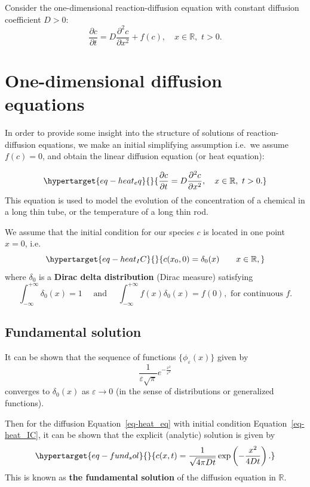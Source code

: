 \documentclass[
  letterpaper,
  DIV=11,
  numbers=noendperiod]{scrreprt}
\theoremstyle{plain}
\theoremstyle{definition}
\theoremstyle{plain}
\theoremstyle{remark}
\begin{document}
Consider the one-dimensional reaction-diffusion equation with constant
diffusion coefficient \(D > 0\): \[
\frac{\partial c}{\partial t} = D \frac{\partial^2 c}{\partial x^2}  + f(c), \quad x\in \mathbb R, \, \, t >0.
\]

\hypertarget{one-dimensional-diffusion-equations}{%
\section{One-dimensional diffusion
equations}\label{one-dimensional-diffusion-equations}}

In order to provide some insight into the structure of solutions of
reaction-diffusion equations, we make an initial simplifying assumption
i.e.~we assume \(f(c)=0\), and obtain the linear diffusion equation (or
heat equation):

\begin{equation}\protect\hypertarget{eq-heat_eq}{}{
\frac{\partial c}{\partial t} = D \frac{\partial^2 c}{\partial x^2},   \quad x\in \mathbb R, \, \, t >0.
}\label{eq-heat_eq}\end{equation} This equation is used to model the
evolution of the concentration of a chemical in a long thin tube, or the
temperature of a long thin rod.

We assume that the initial condition for our species \(c\) is located in
one point \(x=0\), i.e.~
\begin{equation}\protect\hypertarget{eq-heat_IC}{}{
c(x_0 , 0) = \delta_0(x)\qquad x \in \mathbb R, 
}\label{eq-heat_IC}\end{equation} where \(\delta_0\) is a \textbf{Dirac
delta distribution} (Dirac measure) satisfying \[
\int_{-\infty}^{+\infty} \delta_0(x) = 1 \quad \text{ and } \quad \int_{-\infty}^{+\infty} f(x) \delta_0(x) = f(0) , \text{ for continuous } f. 
\]

\hypertarget{fundamental-solution}{%
\subsection{Fundamental solution}\label{fundamental-solution}}

It can be shown that the sequence of functions
\(\{ \phi_\varepsilon(x) \}\) given by \[
\frac 1{\varepsilon \sqrt{\pi} } e^{ - \frac{x^2}{ \varepsilon^2}}
\] converges to \(\delta_0(x)\) as \(\varepsilon \to 0\) (in the sense
of distributions or generalized functions).

Then for the diffusion Equation~\ref{eq-heat_eq} with initial condition
Equation~\ref{eq-heat_IC}, it can be shown that the explicit (analytic)
solution is given by
\begin{equation}\protect\hypertarget{eq-fund_sol}{}{
c(x, t) = \frac1{\sqrt{4 \pi D t}} \exp \left( - \frac{ x^2}{ 4Dt} \right).
}\label{eq-fund_sol}\end{equation} This is known as \textbf{the
fundamental solution} of the diffusion equation in \(\mathbb R\).
\end{document}
